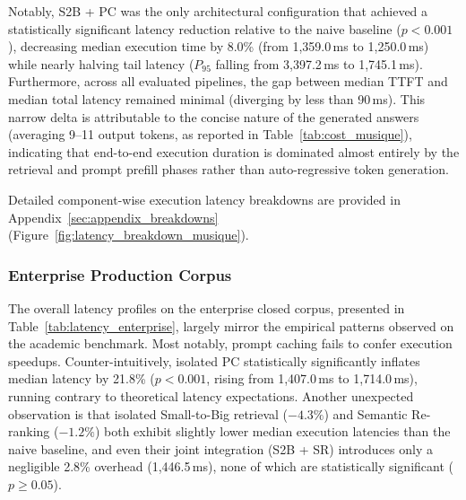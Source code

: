 Notably, S2B + PC was the only architectural configuration that achieved a statistically significant latency reduction relative to the naive baseline ($p < 0.001$), decreasing median execution time by 8.0\% (from 1,359.0\,ms to 1,250.0\,ms) while nearly halving tail latency ($P_{95}$ falling from 3,397.2\,ms to 1,745.1\,ms). Furthermore, across all evaluated pipelines, the gap between median TTFT and median total latency remained minimal (diverging by less than 90\,ms). This narrow delta is attributable to the concise nature of the generated answers (averaging 9--11 output tokens, as reported in Table~\ref{tab:cost_musique}), indicating that end-to-end execution duration is dominated almost entirely by the retrieval and prompt prefill phases rather than auto-regressive token generation.

Detailed component-wise execution latency breakdowns are provided in Appendix~\ref{sec:appendix_breakdowns} (Figure~\ref{fig:latency_breakdown_musique}).

\subsubsection{Enterprise Production Corpus}
\label{subsubsec:latency_enterprise}

The overall latency profiles on the enterprise closed corpus, presented in Table~\ref{tab:latency_enterprise}, largely mirror the empirical patterns observed on the academic benchmark. Most notably, prompt caching fails to confer execution speedups. Counter-intuitively, isolated PC statistically significantly inflates median latency by 21.8\% ($p < 0.001$, rising from 1,407.0\,ms to 1,714.0\,ms), running contrary to theoretical latency expectations. Another unexpected observation is that isolated Small-to-Big retrieval ($-4.3\%$) and Semantic Re-ranking ($-1.2\%$) both exhibit slightly lower median execution latencies than the naive baseline, and even their joint integration (S2B + SR) introduces only a negligible 2.8\% overhead (1,446.5\,ms), none of which are statistically significant ($p \ge 0.05$). 




